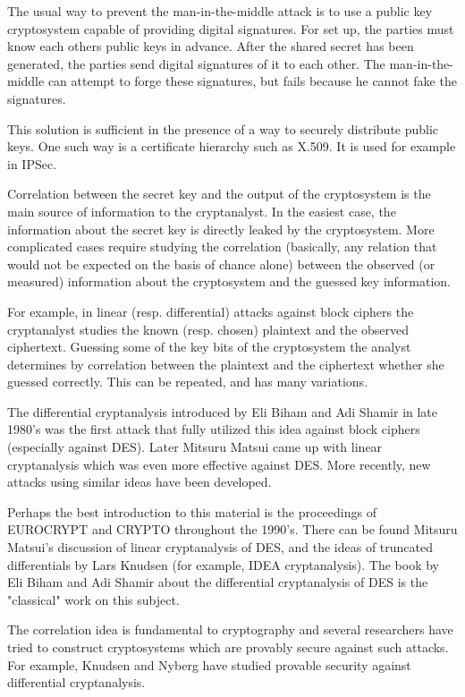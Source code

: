 \documentclass[12pt]{article}
\begin{document}
The usual way to prevent the man-in-the-middle attack is to use a public key cryptosystem capable of providing digital signatures. For set up, the parties must know each others public keys in advance. After the shared secret has been generated, the parties send digital signatures of it to each other. The man-in-the-middle can attempt to forge these signatures, but fails because he cannot fake the signatures.

This solution is sufficient in the presence of a way to securely distribute public keys. One such way is a certificate hierarchy such as X.509. It is used for example in IPSec.

Correlation between the secret key and the output of the cryptosystem is the main source of information to the cryptanalyst. In the easiest case, the information about the secret key is directly leaked by the cryptosystem. More complicated cases require studying the correlation (basically, any relation that would not be expected on the basis of chance alone) between the observed (or measured) information about the cryptosystem and the guessed key information.

For example, in linear (resp. differential) attacks against block ciphers the cryptanalyst studies the known (resp. chosen) plaintext and the observed ciphertext. Guessing some of the key bits of the cryptosystem the analyst determines by correlation between the plaintext and the ciphertext whether she guessed correctly. This can be repeated, and has many variations.

The differential cryptanalysis introduced by Eli Biham and Adi Shamir in late 1980's was the first attack that fully utilized this idea against block ciphers (especially against DES). Later Mitsuru Matsui came up with linear cryptanalysis which was even more effective against DES. More recently, new attacks using similar ideas have been developed.

Perhaps the best introduction to this material is the proceedings of EUROCRYPT and CRYPTO throughout the 1990's. There can be found Mitsuru Matsui's discussion of linear cryptanalysis of DES, and the ideas of truncated differentials by Lars Knudsen (for example, IDEA cryptanalysis). The book by Eli Biham and Adi Shamir about the differential cryptanalysis of DES is the "classical" work on this subject.

The correlation idea is fundamental to cryptography and several researchers have tried to construct cryptosystems which are provably secure against such attacks. For example, Knudsen and Nyberg have studied provable security against differential cryptanalysis.
\end{document}
